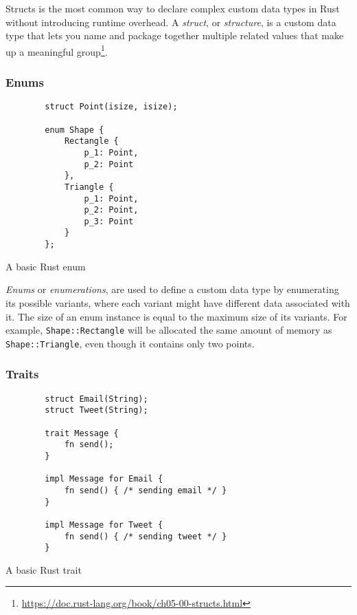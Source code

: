 Structs is the most common way to declare complex custom data types in Rust without introducing runtime overhead. A \emph{struct}, or \emph{structure}, is a custom data type that lets you name and package together multiple related values that make up a meaningful group\footnote{\url{https://doc.rust-lang.org/book/ch05-00-structs.html}}.

\subsubsection*{Enums}

\begin{listing}[!htbp]

    \centering
    \begin{verbatim}
        struct Point(isize, isize);

        enum Shape {
            Rectangle {
                p_1: Point,
                p_2: Point
            },
            Triangle {
                p_1: Point,
                p_2: Point,
                p_3: Point
            }
        };
    \end{verbatim}

    \caption{A basic Rust enum}
    \label{lst:enum}
\end{listing}

\emph{Enums} or \emph{enumerations}, are used to define a custom data type by enumerating its possible variants, where each variant might have different data associated with it. The size of an enum instance is equal to the maximum size of its variants. For example, \texttt{Shape::Rectangle} will be allocated the same amount of memory as \texttt{Shape::Triangle}, even though it contains only two points.

\subsubsection*{Traits}

\begin{listing}[!htbp]

    \centering
    \begin{verbatim}
        struct Email(String);
        struct Tweet(String);

        trait Message {
            fn send();
        }

        impl Message for Email {
            fn send() { /* sending email */ }
        }

        impl Message for Tweet {
            fn send() { /* sending tweet */ }
        }
    \end{verbatim}

    \caption{A basic Rust trait}
    \label{lst:trait}
\end{listing}

